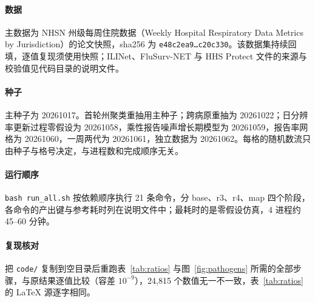 \documentclass[fontset=none,10pt,a4paper]{ctexart}
\theoremstyle{zhplain}
\begin{document}
\paragraph{数据} 主数据为 NHSN 州级每周住院数据（Weekly Hospital Respiratory Data Metrics by Jurisdiction）的论文快照，sha256 为 \texttt{e48c2ea9\dots c20c330}。该数据集持续回填，逐值复现须使用快照；ILINet、FluSurv-NET 与 HHS Protect 文件的来源与校验值见代码目录的说明文件。

\paragraph{种子} 主种子为 20261017。首轮州聚类重抽用主种子；跨病原重抽为 20261022；日分辨率更新过程零假设为 20261058，乘性报告噪声增长期模型为 20261059，报告率网格为 20261060，一周两代为 20261061，独立数据为 20261062。每格的随机数流只由种子与格号决定，与进程数和完成顺序无关。

\paragraph{运行顺序} \nolinkurl{bash run_all.sh} 按依赖顺序执行 21 条命令，分 base、r3、r4、map 四个阶段，各命令的产出键与参考耗时列在说明文件中；最耗时的是零假设仿真，4 进程约 45--60 分钟。

\paragraph{复现核对} 把 \nolinkurl{code/} 复制到空目录后重跑表~\ref{tab:ratios} 与图~\ref{fig:pathogens} 所需的全部步骤，与原结果逐值比较（容差 $10^{-9}$），24,815 个数值无一不一致，表~\ref{tab:ratios} 的 LaTeX 源逐字相同。
\end{document}
